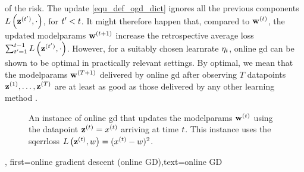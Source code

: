 {{of the \gls{risk}. The update \eqref{equ_def_ogd_dict} ignores all the previous components $L\left({\bf z}^{(t')},\cdot \right)$, 
for $t' < t$. It might therefore happen that, compared to ${\bf w}^{(t)}$, the updated \gls{modelparams} 
${\bf w}^{(t+1)}$ increase the retrospective average \gls{loss} $\sum_{t'=1}^{t-1} L\left({\bf z}^{(t')},\cdot \right)$. 
However, for a suitably chosen \gls{learnrate} $\eta_{t}$, online \gls{gd} can be shown 
to be optimal in practically relevant settings. By optimal, we mean that the \gls{modelparams} 
${\bf w}^{(T+1)}$ delivered by online \gls{gd} after observing $T$ \gls{datapoint}s ${\bf z}^{(1)},\ldots, {\bf z}^{(T)}$ 
are at least as good as those delivered by any other learning method \cite{HazanOCO,GDOptimalRakhlin2012}. 
\begin{figure}[H]
	\begin{center}
\end{center} 
\caption{An instance of online \gls{gd} that updates the \gls{modelparams} ${\bf w}^{(t)}$ 
using the \gls{datapoint} ${\bf z}^{(t)} = x^{(t)}$ arriving at time $t$. 
This instance uses the \gls{sqerrloss} $L\left({\bf z}^{(t)},w \right) = (x^{(t)} - w)^{2}$.
}
\end{figure}},
first={online gradient descent (online GD)},text={online GD}}



